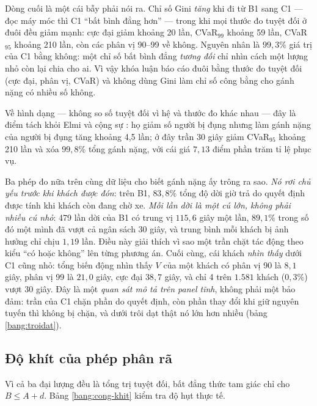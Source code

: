 Dòng cuối là một cái bẫy phải nói ra. Chỉ số Gini \emph{tăng} khi đi từ B1 sang C1 --- đọc máy móc
thì C1 ``bất bình đẳng hơn'' --- trong khi mọi thước đo tuyệt đối ở đuôi đều giảm mạnh: cực đại
giảm khoảng 20 lần, CVaR$_{99}$ khoảng 59 lần, CVaR$_{95}$ khoảng 210 lần, còn các phân vị 90--99
về không.
Nguyên nhân là $99{,}3\%$ giá trị của C1 bằng không: một chỉ số bất bình đẳng \emph{tương đối} chỉ
nhìn cách một lượng nhỏ còn lại chia cho ai. Vì vậy khóa luận báo cáo đuôi bằng thước đo tuyệt đối
(cực đại, phân vị, CVaR) và không dùng Gini làm chỉ số công bằng cho gánh nặng có nhiều số không.

Về hình dạng --- không so số tuyệt đối vì hệ và thước đo khác nhau --- đây là điểm tách khỏi Elmi và
cộng sự \cite{elmi2026}: họ giảm số người bị đụng nhưng làm gánh nặng của người bị đụng tăng khoảng
4,5 lần; ở đây trần 30 giây giảm CVaR$_{95}$ khoảng 210 lần và xóa $99{,}8\%$ tổng gánh nặng, với
cái giá $7{,}13$ điểm phần trăm tỉ lệ phục vụ.

Ba phép đo nữa trên cùng dữ liệu cho biết gánh nặng ấy trông ra sao. \emph{Nó rơi chủ yếu trước khi
khách được đón}: trên B1, $83{,}8\%$ tổng độ dời giờ trả do quyết định được tính khi khách còn đang
chờ xe. \emph{Mỗi lần dời là một cú lớn, không phải nhiều cú nhỏ}: 479 lần dời của B1 có trung vị
$115{,}6$ giây một lần, $89{,}1\%$ trong số đó một mình đã vượt cả ngân sách 30 giây, và trung bình
mỗi khách bị ảnh hưởng chỉ chịu $1{,}19$ lần. Điều này giải thích vì sao một trần chặt tác động theo
kiểu ``có hoặc không'' lên từng phương án. Cuối cùng, cái khách \emph{nhìn thấy} dưới C1 cũng nhỏ:
tổng biến động nhìn thấy $V$ của một khách có phân vị 90 là $8{,}1$ giây, phân vị 99 là $21{,}0$
giây, cực đại $38{,}7$ giây, và chỉ 4 trên $1.581$ khách ($0{,}3\%$) vượt 30 giây. Đây là một
\emph{quan sát mô tả trên panel tĩnh}, không phải một bảo đảm: trần của C1 chặn phần do quyết định,
còn phần thay đổi khi giữ nguyên tuyến thì không bị chặn, và dưới trôi dạt thật nó lớn hơn nhiều
(bảng \ref{bang:troidat}).

\subsection{Độ khít của phép phân rã}

Vì cả ba đại lượng đều là tổng trị tuyệt đối, bất đẳng thức tam giác chỉ cho $B \le A + d$.
Bảng \ref{bang:cong-khit} kiểm tra độ hụt thực tế.

